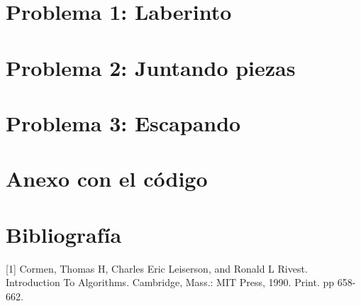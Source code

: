 \documentclass[10pt,a4paper]{article}
\begin{document}
\fecha{\today}


\maketitle
\newpage
\tableofcontents	
\newpage
\section{Problema 1: Laberinto}


\newpage
\section{Problema 2: Juntando piezas}


\newpage
\section{Problema 3: Escapando}


\newpage
\section{Anexo con el c\'odigo}


\newpage
\section{Bibliograf\'ia}

[1] Cormen, Thomas H, Charles Eric Leiserson, and Ronald L Rivest. Introduction To Algorithms. Cambridge, Mass.: MIT Press, 1990. Print. pp 658-662.
\end{document}
